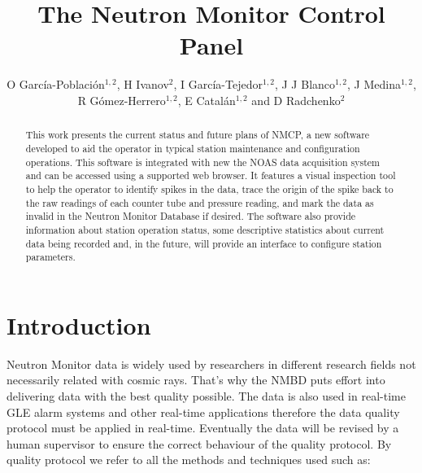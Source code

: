 \documentclass[a4paper]{jpconf}
\begin{document}
\title{The Neutron Monitor Control Panel}

\author{O García-Población$^{1,2}$, H Ivanov$^2$, I García-Tejedor$^{1,2}$,
J J Blanco$^{1,2}$, J Medina$^{1,2}$, R Gómez-Herrero$^{1,2}$, E
Catalán$^{1,2}$ and D Radchenko$^{2}$}

\address{$^1$ Space Research Group, University of Alcalá, Spain}
\address{$^2$ Castilla-La Mancha Neutron Monitor, Parque Tecnológico de Guadalajara, Spain}


\begin{abstract}
    This work presents the current status and future plans of NMCP, a new
    software developed to aid the operator in typical station maintenance and
    configuration operations. This software is integrated with new the NOAS
    data acquisition system and can be accessed using a supported web browser.
    It features a visual inspection tool to help the operator to identify
    spikes in the data, trace the origin of the spike back to the raw readings
    of each counter tube and pressure reading, and mark the data as invalid in
    the Neutron Monitor Database if desired. The software also provide
    information about station operation status, some descriptive statistics
    about current data being recorded and, in the future, will provide an
    interface to configure station parameters.
\end{abstract}

\section{Introduction}

Neutron Monitor data is widely used by researchers in different research fields
not necessarily related with cosmic rays. That's why the NMBD\cite{NMDB2011}
puts effort into delivering data with the best quality possible. The data is
also used in real-time GLE alarm systems and other real-time applications
therefore the data quality protocol must be applied in real-time. Eventually
the data will be revised by a human supervisor to ensure the correct behaviour
of the quality protocol. By quality protocol we refer to all the methods and
techniques used such as:
\end{document}
